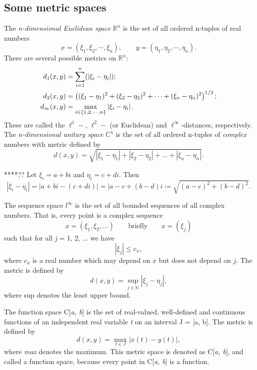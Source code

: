 \documentclass[11pt]{article}
\newcommand{\ex}[0]{\tcbhighmath[boxrule=0.5mm, colframe=pink, colback=pink, arc=10mm, size=fbox]{\mathrm{Ex:}}}
\begin{document}
\subsection{Some metric spaces}
\vspace{1em}
\noindent
\ex{}
The \textit{n-dimensional Euclidean space} $\mathbb{R}^n$ is the set of all ordered n-tuples of real numbers
\[x = (\xi_1,\xi_2,\cdots,\xi_n), \quad\quad y = (\eta_1, \eta_2, \cdots, \eta_n). \]
There are several possible metrics on $\mathbb{R}^n$:
\begin{align*}
  d_1(x,y) &= \sum_{i=1}^{n}(\left|\xi_i - \eta_i\right|); \\
  \vspace{-2em}
  d_2(x,y) &= \left( (\xi_1 - \eta_1)^2 +(\xi_2 - \eta_2)^2 + \cdots + (\xi_n - \eta_n)^2 \right)^{1/2};\\
  d_{\infty}(x,y) &= \max_{i \in \{1,2,\cdots, n\}} \left|\xi_i - \eta_i\right|.
\end{align*}
These are called the $\ell^1-$, $\ell^2-$ (or Euclidean) and $\ell^{\infty}$-distances, respectively.\\

The \emph{n-dimensional unitary space} $\mathbb{C}^n$ is the set of all ordered n-tuples of \emph{complex} numbers with metric defined by
$$ d(x,y) = \sqrt{|\xi_1 - \eta_1| +|\xi_2 - \eta_2| + ... + |\xi_n - \eta_n|}. $$

****?? Let $\xi_i = a + b\textit{i}$ and $\eta_i = c + d\textit{i}$. Then $$|\xi_i - \eta_i| = |a + b\textit{i} - (c + d\textit{i})| = |a - c + (b - d)\textit{i} \coloneq \sqrt{(a - c)^2 + (b - d)^2}. $$

\vspace{1em}
\noindent
{}
The sequence space $l^\infty$ is the set of all bounded sequences of all complex numbers. That is, every point is a complex sequence
$$ x = (\xi_1, \xi_2,...) \quad\quad \mathrm{briefly } \quad\quad x = (\xi_j)$$
such that for all \textit{j} = 1, 2, ... we have $$|\xi_j| \leq c_x,$$ where $c_x$ is a real number which may depend on $x$ but does not depend on $j$. The metric is defined by $$d(x, y) = \sup\limits_{j \in \mathbb{N}}|\xi_j - \eta_j|,$$
where sup denotes the least upper bound.

\vspace{1em}
\noindent
{}
The function space C[\textit{a, b}] is the set of real-valued, well-defined and continuous functions of an independent real variable \textit{t} on an interval J = [a, b]. The metric is defined by
$$d(x, y) = \max\limits_{t \in J}|x(t) - y(t)|,$$
where \textit{max} denotes the maximum. This metric space is denoted as C[\textit{a, b}], and called a function space, because every point in C[\textit{a, b}] is a function.
\end{document}
